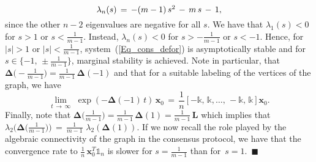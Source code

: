 \documentclass[letterpaper,9pt,twocolumn]{autart}
\newcommand{\vet}[1]{\ensuremath{{\mathbf #1}}}
\begin{document}
\begin{proposition}[$m$-cube $Q_m$]
$$\begin{array}{l}
\lambda_{n}(s) \,=\, -(m-1)\,s^2 \,-\, m\,s \,-\, 1, \vspace{-0.1cm}\end{array}
$$
since the other $n-2$ eigenvalues are negative for all $s$.
We have that $\lambda_{1}(s) < 0$ for $s > 1$ or $s < \frac{1}{m-1}$. Instead,
$\lambda_{n}(s) < 0$ for $s > -\frac{1}{m-1}$ or $s < -1$. Hence,  
for $|s| > 1$ or $|s| < \frac{1}{m-1}$, system~(\ref{Eq_cons_defor})
is asymptotically stable and for~$s \in \{-1,\,\pm \frac{1}{m-1}\}$,
marginal stability is achieved. Note in particular, that 
$\boldsymbol{\Delta}\big(\!-\!\frac{1}{m-1}\big) = \frac{1}{m-1}\,\boldsymbol{\Delta}(-1)$
and that for a suitable labeling of the vertices of the graph, we have $$
\!\lim\limits_{t \,\rightarrow \, \infty}
\,\,\exp(-\boldsymbol{\Delta}(-1)\,t)\,\vet{x}_0 \,=\, \frac{1}{n}\left[-\mathds{k},\,\mathds{k},\ldots,\,-\mathds{k},\,\mathds{k}\right]\vet{x}_0.
$$
Finally, note that $\boldsymbol{\Delta}\big(\frac{1}{m-1}\big) 
= \frac{1}{m-1}\,\boldsymbol{\Delta}(1) = \frac{1}{m-1}\,\vet{L}$ 
which implies that $\lambda_2\big(\boldsymbol{\Delta}\big(\frac{1}{m-1}\big)\big) 
\,=\, \frac{1}{m-1}\,\,\lambda_2\left(\boldsymbol{\Delta}(1)\right)$.
If we now recall the role played by the algebraic connectivity of the graph in the
consensus protocol, we have that
the convergence rate to $\frac{1}{n}\,\vet{x}_0^T\mathds{1}_{n}$
is slower for $s = \frac{1}{m-1}$ than for~$s = 1$.~\hfill$\blacksquare$ 
\end{proposition}
\vspace{-0.07cm}
\end{document}

